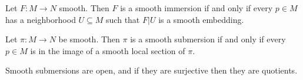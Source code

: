 
\begin{theorem}\label{?}
	Let $F : M \to N$ smooth. Then $F$ is a smooth immersion if and only if every $p\in M$ has a neighborhood $U\subseteq M$ such that $F|U$ is a smooth embedding.
\end{theorem}

\begin{theorem}\label{???}
	Let $\pi : M \to N$ be smooth. Then $\pi $ is a smooth submersion if and only if every $p\in M$ is in the image of a smooth local section of $\pi $.
\end{theorem}

Smooth submersions are open, and if they are surjective then they are quotients.

